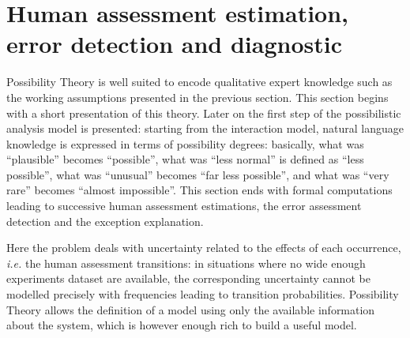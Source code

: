 \section{Human assessment estimation, error detection and diagnostic}
\label{analysisModel}
Possibility Theory is well suited to encode
qualitative expert knowledge such as 
the working assumptions presented in the previous section.
This section begins with a short presentation 
of this theory. Later on the first step of
the possibilistic analysis model is presented: 
starting from the interaction model, 
natural language knowledge is expressed in terms 
of possibility degrees: basically, 
what was ``plausible'' becomes ``possible'', 
what was ``less normal'' is defined as ``less possible'', 
what was ``unusual'' becomes ``far less possible'', 
and what was ``very rare'' becomes ``almost impossible''.
This section ends with formal computations 
leading to successive human assessment 
estimations, the error assessment detection 
and the exception explanation.

Here the problem deals with uncertainty 
related to the effects of each occurrence,
\textit{i.e.} the human assessment transitions: 
in situations where no wide enough experiments dataset are available, 
the corresponding uncertainty cannot be modelled precisely 
with frequencies leading to transition probabilities. 
Possibility Theory allows the definition of a model 
using only the available information about the system, 
which is however enough rich to build a useful model. 

